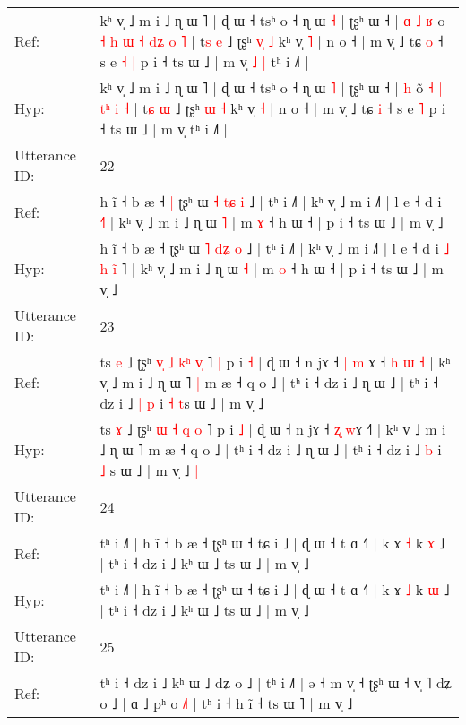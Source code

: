 \documentclass[10pt]{article}
\DeclareRobustCommand{\hl}[1]{{\textcolor{red}{#1}}}
\begin{document}
\begin{longtable}{ll}
Ref: & kʰ v̩ ˩ m i ˩ ɳ ɯ ˥ | ɖ ɯ ˧ tsʰ o ˧ ɳ ɯ \hl{˧} | ʈʂʰ ɯ ˧ |\hl{ }\hl{ɑ}\hl{ }\hl{˩} \hl{ʁ} o\hl{ }\hl{˧}\hl{ }\hl{h} \hl{ɯ} \hl{˧} \hl{d}\hl{ʑ} \hl{o} \hl{˥} | t\hl{s} \hl{e} ˩ ʈʂʰ \hl{v}\hl{̩} \hl{˩} kʰ v̩ \hl{˥} | n o ˧ | m v̩ ˩ tɕ \hl{o} ˧ s e\hl{ }\hl{˧} \hl{|} p i ˧ ts ɯ ˩ | m v̩\hl{ }\hl{˩}\hl{ }\hl{|} tʰ i ˩˥ |
 \\
Hyp: & kʰ v̩ ˩ m i ˩ ɳ ɯ ˥ | ɖ ɯ ˧ tsʰ o ˧ ɳ ɯ \hl{˥} | ʈʂʰ ɯ ˧ |\hl{}\hl{}\hl{}\hl{} \hl{h} o\hl{}\hl{}\hl{}\hl{̃} \hl{˧} \hl{|} \hl{t}\hl{ʰ} \hl{i} \hl{˧} | t\hl{ɕ} \hl{ɯ} ˩ ʈʂʰ \hl{}\hl{ɯ} \hl{˧} kʰ v̩ \hl{˧} | n o ˧ | m v̩ ˩ tɕ \hl{i} ˧ s e\hl{}\hl{} \hl{˥} p i ˧ ts ɯ ˩ | m v̩\hl{}\hl{}\hl{}\hl{} tʰ i ˩˥ |
 \\
\midrule
Utterance ID: & 22 \\
Ref: & h ĩ ˧ b æ ˧\hl{ }\hl{|} ʈʂʰ ɯ \hl{˧} \hl{t}\hl{ɕ} \hl{i} ˩ | tʰ i ˩˥ | kʰ v̩ ˩ m i ˩˥ | l e ˧ d i\hl{}\hl{}\hl{}\hl{} \hl{}\hl{}\hl{˧}˥ | kʰ v̩ ˩ m i ˩ ɳ ɯ \hl{˥} | m \hl{ɤ} ˧ h ɯ ˧ | p i ˧ ts ɯ ˩ | m v̩ ˩
 \\
Hyp: & h ĩ ˧ b æ ˧\hl{}\hl{} ʈʂʰ ɯ \hl{˥} \hl{d}\hl{ʑ} \hl{o} ˩ | tʰ i ˩˥ | kʰ v̩ ˩ m i ˩˥ | l e ˧ d i\hl{ }\hl{˩}\hl{ }\hl{h} \hl{i}\hl{̃}\hl{ }˥ | kʰ v̩ ˩ m i ˩ ɳ ɯ \hl{˧} | m \hl{o} ˧ h ɯ ˧ | p i ˧ ts ɯ ˩ | m v̩ ˩
 \\
\midrule
Utterance ID: & 23 \\
Ref: & ts \hl{e} ˩ ʈʂʰ \hl{v}\hl{̩} \hl{˩} \hl{k}\hl{ʰ} \hl{v}\hl{̩} ˥\hl{ }\hl{|} p i \hl{˧} | ɖ ɯ ˧ n jɤ ˧ \hl{|} \hl{m}\hl{ }ɤ ˧\hl{ }\hl{h}\hl{ }\hl{ɯ}\hl{ }\hl{˧} | kʰ v̩ ˩ m i ˩ ɳ ɯ ˥\hl{ }\hl{|} m æ ˧ q o ˩ | tʰ i ˧ dz i ˩ ɳ ɯ ˩ | tʰ i ˧ dz i ˩\hl{ }\hl{|} \hl{p} i \hl{˧} \hl{t}s ɯ ˩ | m v̩ ˩\hl{}\hl{}
 \\
Hyp: & ts \hl{ɤ} ˩ ʈʂʰ \hl{}\hl{ɯ} \hl{˧} \hl{}\hl{q} \hl{}\hl{o} ˥\hl{}\hl{} p i \hl{˩} | ɖ ɯ ˧ n jɤ ˧ \hl{ʐ} \hl{}\hl{w}ɤ ˧\hl{}\hl{}\hl{}\hl{}\hl{}\hl{˥} | kʰ v̩ ˩ m i ˩ ɳ ɯ ˥\hl{}\hl{} m æ ˧ q o ˩ | tʰ i ˧ dz i ˩ ɳ ɯ ˩ | tʰ i ˧ dz i ˩\hl{}\hl{} \hl{b} i \hl{˩} \hl{}s ɯ ˩ | m v̩ ˩\hl{ }\hl{|}
 \\
\midrule
Utterance ID: & 24 \\
Ref: & tʰ i ˩˥ | h ĩ ˧ b æ ˧ ʈʂʰ ɯ ˧ tɕ i ˩ | ɖ ɯ ˧ t ɑ ˧˥ | k ɤ \hl{˧} k \hl{ɤ} ˩ | tʰ i ˧ dz i ˩ kʰ ɯ ˩ ts ɯ ˩ | m v̩ ˩
 \\
Hyp: & tʰ i ˩˥ | h ĩ ˧ b æ ˧ ʈʂʰ ɯ ˧ tɕ i ˩ | ɖ ɯ ˧ t ɑ ˧˥ | k ɤ \hl{˩} k \hl{ɯ} ˩ | tʰ i ˧ dz i ˩ kʰ ɯ ˩ ts ɯ ˩ | m v̩ ˩
 \\
\midrule
Utterance ID: & 25 \\
Ref: & tʰ i ˧ dz i ˩ kʰ ɯ ˩ dʑ o ˩ | tʰ i ˩˥ | ə ˧ m v̩ ˧ ʈʂʰ ɯ ˧ v̩ \hl{}˥\hl{}\hl{} dʑ o ˩ | ɑ ˩ pʰ o \hl{˩}\hl{˥} | tʰ i ˧ h ĩ ˧ ts ɯ ˥ | m v̩ ˩\hl{}\hl{}

\end{longtable}
\end{document}

